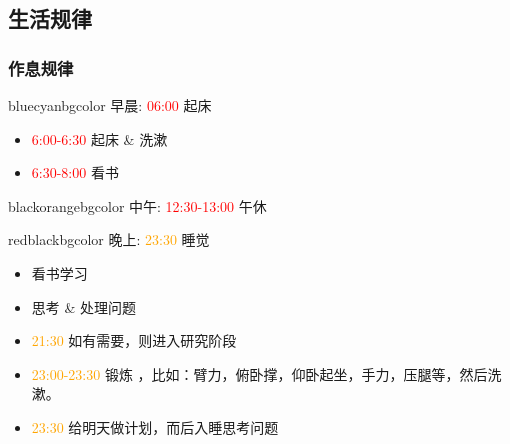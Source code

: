 \subsection{生活规律}
\begin{frame}
	\frametitle{作息规律}
    \begin{beamercolorbox}[rounded=true,shadow=true,wd=12cm]{bluecyanbgcolor}
    早晨: \textcolor{red}{06:00} 起床\\
    \begin{itemize}
        \item \textcolor{red}{6:00-6:30} 起床 \& 洗漱
        \item \textcolor{red}{6:30-8:00} 看书
    \end{itemize}
    \end{beamercolorbox}
    \begin{beamercolorbox}[rounded=true,shadow=true,wd=12cm]{blackorangebgcolor}
    中午: \textcolor{red}{12:30-13:00} 午休\\
    \end{beamercolorbox}
    \begin{beamercolorbox}[rounded=true,shadow=true,wd=12cm]{redblackbgcolor}
    晚上: \textcolor{orange}{23:30} 睡觉\\
    \begin{itemize}
    \item 看书学习
    \item 思考 \& 处理问题
    \item \textcolor{orange}{21:30} 如有需要，则进入研究阶段
    \item \textcolor{orange}{23:00-23:30} 锻炼 ，比如：臂力，俯卧撑，仰卧起坐，手力，压腿等，然后洗漱。
    \item \textcolor{orange}{23:30} 给明天做计划，而后入睡思考问题
    \end{itemize}
    \end{beamercolorbox}
\end{frame}

